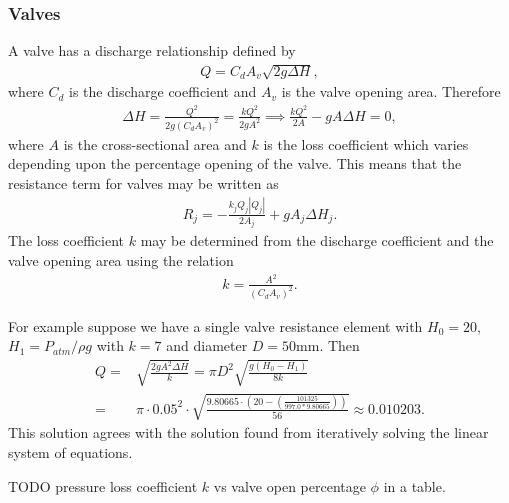 \subsubsection{Valves}

A valve has a discharge relationship defined by 
\begin{align}
Q = C_d A_v \sqrt{2 g \Delta H},
\end{align}
where $C_d$ is the discharge coefficient and $A_v$ is the valve opening area. Therefore 
\begin{align}
\Delta H = \frac{Q^2}{2g\left(C_d A_v \right)^2} = \frac{k Q^2}{2 g A^2} \implies \frac{k Q^2}{2A} - g A \Delta H = 0,
\end{align}
where $A$ is the cross-sectional area and $k$ is the loss coefficient which varies depending upon the percentage opening of the valve. This means that the resistance term for valves may be written as
\begin{align} \label{valve_resistance}
\boxed{ R_j = - \frac{k_j Q_j|Q_j| }{2 A_j} + g A_j \Delta H_j. }
\end{align}
The loss coefficient $k$ may be determined from the discharge coefficient and the valve opening area using the relation 
\begin{align}
k = \frac{A^2}{\left(C_d A_v \right)^2}.
\end{align}

For example suppose we have a single valve resistance element with $H_0 = 20$, $H_1 = P_{atm} / \rho g$ with $k = 7$ and diameter $D = 50$mm. Then 
\begin{align}
Q =& \sqrt{\frac{2gA^2 \Delta H}{k}} = \pi D^2 \sqrt{\frac{g \left(H_0 - H_1 \right)}{8k}} \nonumber \\ =& \pi \cdot 0.05^2 \cdot \sqrt{\frac{9.80665 \cdot \left(20 - \left( \frac{101325}{ 997.0 * 9.80665} \right) \right)}{56}} \approx 0.010203.
\end{align} 
This solution agrees with the solution found from iteratively solving the linear system of equations. 

{\color{red} TODO pressure loss coefficient $k$ vs valve open percentage $\phi$ in a table.}

